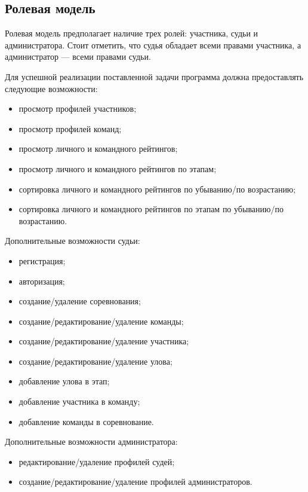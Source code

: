 \newpage


\subsection{Ролевая модель}

Ролевая модель предполагает наличие трех ролей: участника, судьи и администратора. Стоит отметить, что судья обладает всеми правами участника, а администратор --- всеми правами судьи.

Для успешной реализации поставленной задачи программа должна предоставлять следующие возможности:
\begin{itemize}[label=---]
	\item просмотр профилей участников;
	\item просмотр профилей команд;
	\item просмотр личного и командного рейтингов;
	\item просмотр личного и командного рейтингов по этапам;
	\item сортировка личного и командного рейтингов по убыванию/по возрастанию;
	\item сортировка личного и командного рейтингов по этапам по убыванию/по возрастанию.
\end{itemize}

Дополнительные возможности судьи:
\begin{itemize}[label=---]
	\item регистрация;
	\item авторизация;
	\item создание/удаление соревнования;
	\item создание/редактирование/удаление команды;
	\item создание/редактирование/удаление участника;
	\item создание/редактирование/удаление улова;
	\item добавление улова в этап;
	\item добавление участника в команду;
	\item добавление команды в соревнование.
\end{itemize}

Дополнительные возможности администратора:
\begin{itemize}[label=---]
	\item редактирование/удаление профилей судей;
	\item создание/редактирование/удаление профилей администраторов.
\end{itemize}

